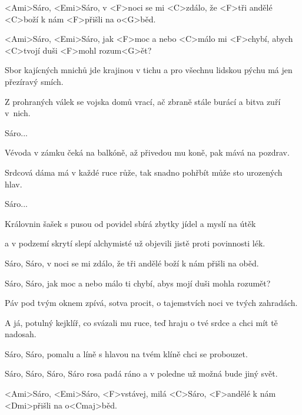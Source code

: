 

\zr
<Ami>Sáro, <Emi>Sáro, v <F>noci se mi <C>zdálo,
že <F>tři andělé <C>boží k nám <F>přišli na o<G>běd.

<Ami>Sáro, <Emi>Sáro, jak <F>moc a nebo <C>málo
mi <F>chybí, abych <C>tvojí duši <F>mohl rozum<G>ět?
\kr

\zs
Sbor kajícných mnichů jde krajinou v tichu
a pro všechnu lidskou pýchu má jen přezíravý smích.

Z prohraných válek se vojska domů vrací,
ač zbraně stále burácí a bitva zuří v~nich.
\ks

\zr
Sáro...
\kr

\zs
Vévoda v zámku čeká na balkóně,
až přivedou mu koně, pak mává na pozdrav.

Srdcová dáma má v každé ruce růže,
tak snadno pohřbít může sto urozených hlav.
\ks

\zr
Sáro...
\kr

\zs
Královnin šašek s pusou od povidel
sbírá zbytky jídel a myslí na útěk

a v podzemí skrytí slepí alchymisté
už objevili jistě proti povinnosti lék.
\ks

\zr
Sáro, Sáro, v noci se mi zdálo,
že tři andělé boží k nám přišli na oběd.

Sáro, Sáro, jak moc a nebo málo
ti chybí, abys mojí duši mohla rozumět?
\kr

\zs
Páv pod tvým oknem zpívá, sotva procit,
o tajemstvích noci ve tvých zahradách.

A já, potulný kejklíř, co svázali mu ruce,
teď hraju o tvé srdce a chci mít tě nadosah.
\ks

\zr
Sáro, Sáro, pomalu a líně
s hlavou na tvém klíně chci se probouzet.

Sáro, Sáro, Sáro, Sáro rosa padá ráno
a v poledne už možná bude jiný svět.
\kr

\zs
<Ami>Sáro, <Emi>Sáro, <F>vstávej, milá <C>Sáro,
<F>andělé k nám <Dmi>přišli na o<Cmaj>běd.
\ks

\kp
